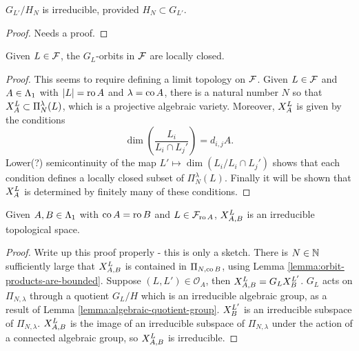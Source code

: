 \documentclass[a4paper, 11pt]{report}
\begin{document}
\begin{lemma}
$G_{L'}/H_N$ is irreducible, provided $H_N\subset G_{L'}$.
\end{lemma}

{\color{blue}
\begin{proof}
Needs a proof.
\end{proof}
}

\begin{lemma}\label{lemma:locally-closed-orbits}
Given $L\in\flags$, the $G_L$-orbits in $\flags$ are locally closed.
\end{lemma}

{\color{blue}
\begin{proof}
This seems to require defining a limit topology on $\flags$. Given $L\in\flags$ and $A\in\matrices$ with $|L|=\ro{A}$ and $\lambda =\co{A}$, there is a natural number $N$ so that $\xprod[L]{A}\subset\Pi_N^\lambda(L)$, which is a projective algebraic variety. Moreover, $\xprod[L]{A}$ is given by the conditions
\begin{equation*}
\dim\left(\frac{L_i}{L_i\cap L_j'}\right) = d_{i,j}{A}.
\end{equation*}
Lower(?) semicontinuity of the map $L'\mapsto\dim\left(L_i/{L_i\cap L_j'}\right)$ shows that each condition defines a locally closed subset of $\Pi_N^\lambda(L)$. Finally it will be shown that $\xprod[L]{A}$ is determined by finitely many of these conditions.
\end{proof}
}

\begin{lemma}\label{lemma:irreducible-product}
Given $A,B\in\matrices$ with $\co{A}=\ro{B}$ and $L\in\flags_{\ro{A}}$, $\xprod[L]{A,B}$ is an irreducible topological space.
\end{lemma}

{\color{blue}
\begin{proof}
Write up this proof properly - this is only a sketch. There is $N\in\naturals$ sufficiently large that $\xprod[L]{A,B}$ is contained in $\Pi_{N,\co{B}}$, using Lemma \ref{lemma:orbit-products-are-bounded}. Suppose $(L,L')\in\mathcal{O}_A$, then $\xprod[L]{A,B} = G_L \xprod[L']{B}$. $G_L$ acts on $\Pi_{N,\lambda}$ through a quotient $G_L/H$ which is an irreducible algebraic group, as a result of Lemma \ref{lemma:algebraic-quotient-group}. {\color{blue}$\xprod[L']{B}$ is an irreducible subspace of $\Pi_{N,\lambda}$}. $\xprod[L]{A,B}$ is the image of an irreducible subspace of $\Pi_{N,\lambda}$ under the action of a connected algebraic group, so $\xprod[L]{A,B}$ is irreducible.
\end{proof}
}
\end{document}
